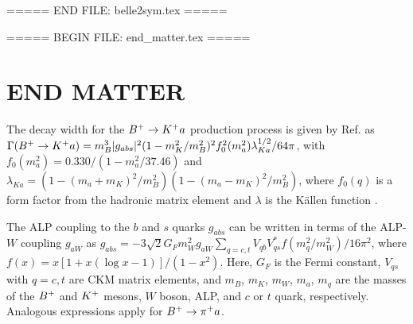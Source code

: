 \newcommand{\stat}{\ensuremath{\mathrm{(stat)}}\xspace}
\newcommand{\syst}{\ensuremath{\mathrm{(syst)}}\xspace}

\newcommand{\inverse}{\ensuremath{^{-1}}\xspace}
\newcommand{\dedx}{\ensuremath{\mathrm{d}\hspace{-0.1em}E/\mathrm{d}x}\xspace}
\newcommand{\chisq}{\ensuremath{\chi^2}\xspace}
\newcommand{\delm}{\ensuremath{m_{\dstr}-m_{\dz}}\xspace}
\newcommand{\lum} {\ensuremath{\mathcal{L}}\xspace}

\def\gsim{{~\raise.15em\hbox{$>$}\kern-.85em
          \lower.35em\hbox{$\sim$}~}\xspace}
\def\lsim{{~\raise.15em\hbox{$<$}\kern-.85em
          \lower.35em\hbox{$\sim$}~}\xspace}

\def\qsq                {\ensuremath{q^2}\xspace}


\def\Btag {\ensuremath{B_{\rm{tag}}}\xspace}
\def\Bsig {\ensuremath{B_{\rm{sig}}}\xspace}
\def\eecl {\ensuremath{E_{\rm{ECL}}}\xspace}
\def\Mbc  {\ensuremath{M_{\rm{bc}}}\xspace}
\def\alp  {\ensuremath{a}\xspace}
\def\S    {\ensuremath{S}\xspace}
\def\psiD {\ensuremath{\psi_{D}}\xspace}
\def\phs  {\ensuremath{p_{h}^{S}}\xspace}
\def\psh  {\ensuremath{p_{h}^{S}}\xspace}
\def\ph   {\ensuremath{p_{h}}\xspace}
\def\Xinv {\ensuremath{X_{\rm{inv}}}\xspace}
\def\cpion {\ensuremath{\Bp\to\pip\Xinv}\xspace}
\def\ckaon {\ensuremath{\Bp\to\Kp\Xinv}\xspace}
\def\cproton {\ensuremath{\Bp\to\proton\Xinv}\xspace}
\def\cDs {\ensuremath{\Bp\to\Ds\Xinv}\xspace}
\def\cDz {\ensuremath{\Bz\to\Dzb\Xinv}\xspace}
\def\X {\ensuremath{X\xspace}}
===== END FILE: belle2sym.tex =====

===== BEGIN FILE: end_matter.tex =====
\appendix
{}

\section*{END MATTER}
\renewcommand{\thefigure}{\arabic{figure}}
\setcounter{figure}{2}
The decay width for the $\Bp\to\Kp\alp$ production process is given by Ref. \cite{Izaguirre_2017} as $\Gamma(\Bp\to\Kp\alp) = m^3_B|g_{abs}|^2(1 - m^2_K/m^2_B)^2 f^2_0(m_a^2)\lambda^{1/2}_{Ka}/64\pi$, with $f_0(m_a^2) = 0.330/(1 - m_a^2/37.46)$ and $\lambda_{Ka} = (1 - (m_a + m_K)^2/m_B^2)(1 - (m_a - m_K)^2/m_B^2)$, where $f_0(q)$ is a form factor from the hadronic matrix element \cite{PhysRevD.71.014015} and $\lambda$ is the Källen function \cite{Kallen:1964lxa}.

The ALP coupling to the $b$ and $s$ quarks $g_{abs}$ can be written in terms of the ALP-$W$ coupling $g_{aW}$ as $g_{abs} = -3\sqrt{2}G_Fm_W^2g_{aW}\sum_{q = c,t}V_{q b}V^*_{q s}f(m_q^2/m_W^2)/16\pi^2$, where $f(x) = x[1 + x(\log x -1)]/(1 - x^2)$. Here, $G_F$ is the Fermi constant, $V_{q s}$ with $q = c,t$ are CKM matrix elements, and $m_B$, $m_K$, $m_W$, $m_\alp$, $m_q$ are the masses of the $B^+$ and $K^+$ mesons, $W$ boson, ALP, and $c$ or $t$ quark, respectively. Analogous expressions apply for $\Bp\to\pip\alp$.

